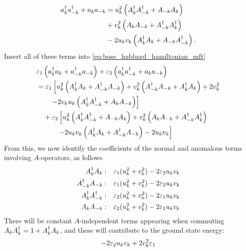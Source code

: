 \begin{equation}
	\begin{aligned}
			a_{k}^{\dagger}a_{-k}^{\dagger} + a_{k}a_{-k} &= u_{k}^2\left (A_{k}^{\dagger}A_{-k}^{\dagger} + A_{-k}A_{k}\right ) \\
			&+ v_k^2\left (A_{k}A_{-k} + A_{-k}^{\dagger}A_{k}^{\dagger}\right ) \\
			& -2u_kv_k\left (A_{k}^{\dagger}A_{k} + A_{-k}A_{-k}^{\dagger}\right ).
	\end{aligned}
\end{equation}
Insert all of these terms into \cref{eq:bose_hubbard_hamiltonian_mft}
\begin{equation}
	\begin{aligned}
	&\varepsilon_1\left (a_{k}^{\dagger}a_{k} + a_{-k}^{\dagger}a_{-k}\right ) + \varepsilon_{2}\left (a_{k}^{\dagger}a_{-k}^{\dagger} + a_{k}a_{-k}\right ) \\
	&= \varepsilon_{1}\left [u_k^2\left (A_{k}^{\dagger}A_{k} +A_{-k}^{\dagger}A_{-k}\right ) + v_{k}^2\left (A_{-k}^{\dagger}A_{-k} + A_{k}^{\dagger}A_{k}\right ) + 2v_k^2\right . \\
	&\qquad \left .-2v_ku_k\left (A_{k}^{\dagger}A_{-k}^{\dagger}+A_{k}A_{-k}\right )\right ] \\
	&\quad+ \varepsilon_2 \left [u_{k}^2\left (A_{k}^{\dagger}A_{-k}^{\dagger} + A_{-k}A_{k}\right )+ v_k^2\left (A_{k}A_{-k} + A_{-k}^{\dagger}A_{k}^{\dagger}\right )\right . \\
	&\quad \qquad \left . -2u_kv_k\left (A_{k}^{\dagger}A_{k} + A_{-k}^{\dagger}A_{-k}\right ) - 2u_kv_k\right ]
	\end{aligned}
\end{equation}
From this, we now identify the coefficients of the normal and anomalous terms involving $A$-operators, as follows
\begin{equation}
	\begin{aligned}
		A_{k}^{\dagger}A_{k}: && \varepsilon_1(u_k^2 + v_k^2)-2\varepsilon_2 u_kv_k \\	A_{-k}^{\dagger}A_{-k}: && \varepsilon_1(u_k^2 + v_k^2)-2\varepsilon_2 u_kv_k \\
		A_{k}^{\dagger}A_{-k}^{\dagger}: && \varepsilon_2(u_k^2 + v_k^2)-2\varepsilon_1 u_kv_k\\
		A_{k}A_{-k}: && \varepsilon_2(u_k^2 + v_k^2)-2\varepsilon_1 u_kv_k
	\end{aligned}
\end{equation}
There will be constant $A$-independent terms appearing when commuting $A_{k}A_{k}^{\dagger} = 1 + A_{k}^{\dagger}A_{k}$, and these will contribute to the ground state energy:
\begin{equation}
	-2\varepsilon_2u_kv_k + 2v_k^2\varepsilon_1
\end{equation}
